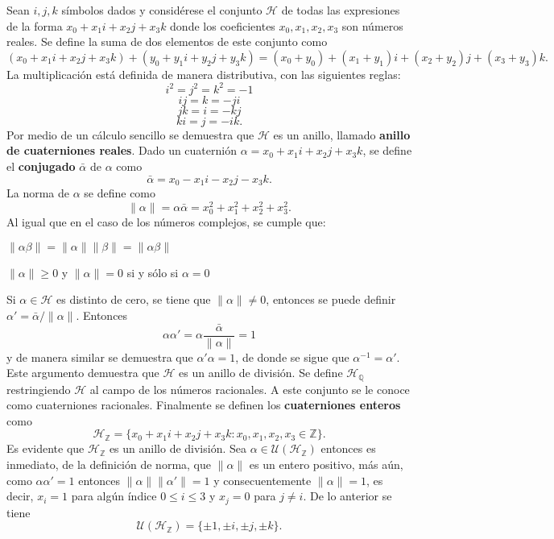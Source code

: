 \begin{ejemplo}
Sean $i,j,k$ símbolos dados y considérese el conjunto $\mathcal{H}$ de todas las expresiones de la forma $x_0 + x_1i+x_2j+x_3k$ donde los coeficientes $x_0,x_1,x_2,x_3$ son números reales.
Se define la suma de dos elementos de este conjunto como \[ (x_0 + x_1i+x_2j+x_3k)+(y_0 + y_1i+y_2j+y_3k) = (x_0 + y_0) + (x_1 + y_1)i + (x_2+y_2)j + (x_3+y_3)k.  \] La multiplicación está definida de manera distributiva, con las siguientes reglas:
\begin{equation*}
i^2 = j^2 = k^2 = -1
\end{equation*}
\begin{equation*}
ij = k = -ji
\end{equation*} \[ jk = i = -kj \] \[ ki = j = -ik .\] Por medio de un cálculo sencillo se demuestra que $\mathcal{H}$ es un anillo, llamado \textbf{anillo de cuaterniones reales}. Dado un cuaternión $\alpha = x_0 + x_1i + x_2j + x_3k$, se define el \textbf{conjugado} $\bar{\alpha}$ de $\alpha$ como \[ \bar{\alpha} = x_0-x_1i - x_2j-x_3k. \] La norma de $\alpha$ se define como \[ \lVert \alpha \rVert = \alpha\bar{\alpha} = x_0 ^2 + x_1^2 + x_ 2^2 + x_ 3^2. \]
Al igual que en el caso de los números complejos, se cumple que:
\begin{bulletList}
\item $\lVert \alpha\beta \rVert = \lVert \alpha \rVert \lVert \beta \rVert = \lVert \alpha\beta \rVert$
\item $\lVert \alpha \rVert \geq 0$ y $\lVert \alpha \rVert  = 0 $ si y sólo si $\alpha = 0 $
\end{bulletList}
Si $\alpha \in \mathcal{H}$ es distinto de cero, se tiene que $\lVert \alpha \rVert \neq 0$, entonces se puede definir $\alpha' = \bar{\alpha}/\lVert \alpha \rVert$. Entonces \[ \alpha\alpha'= \alpha \frac{\bar{\alpha}}{\lVert \alpha \rVert} = 1 \] y de manera similar se demuestra que $\alpha'\alpha = 1$, de donde se sigue que $\alpha^{-1} = \alpha'$. Este argumento demuestra que $\mathcal{H}$ es un anillo de división.
Se define $\mathcal{H}_{\mathds{Q}}$ restringiendo $\mathcal{H}$ al campo de los números racionales. A este conjunto se le conoce como cuaterniones racionales.
Finalmente se definen los \textbf{cuaterniones enteros} como \[ \mathcal{H}_{\mathds{Z}} = \{ x_0 + x_1i + x_2j + x_3k \colon x_0, x_1, x_2, x_3 \in \mathds{Z} \}. \]
Es evidente que $\mathcal{H}_{\mathds{Z}}$ es un anillo de división.
Sea $\alpha \in \mathcal{U}(\mathcal{H}_{\mathds{Z}})$ entonces es inmediato, de la definición de norma, que $\lVert \alpha \rVert$ es un entero positivo, más aún, como $\alpha\alpha'= 1$ entonces $\lVert \alpha \rVert \lVert \alpha'\rVert = 1$ y consecuentemente $\lVert \alpha \rVert = 1$, es decir, $x_i = 1$ para algún índice $0\leq i \leq 3 $ y $x_j = 0 $ para $j \neq i$. De lo anterior se tiene \[ \mathcal{U}(\mathcal{H}_{\mathds{Z}}) = \{ \pm1, \pm i, \pm j, \pm k \}. \] 
\end{ejemplo} 
